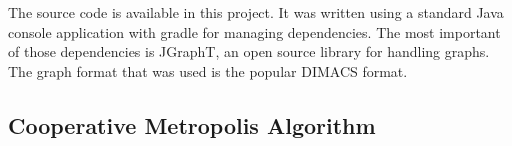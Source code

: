 \documentclass[runningheads]{llncs}
\begin{document}
The source code is available in this project. It was written using a standard Java console application with gradle for managing dependencies. The most important of those dependencies is JGraphT, an open source library for handling graphs. The graph format that was used is the popular DIMACS format.

\subsection{Cooperative Metropolis Algorithm}







\printbibliography
\end{document}
